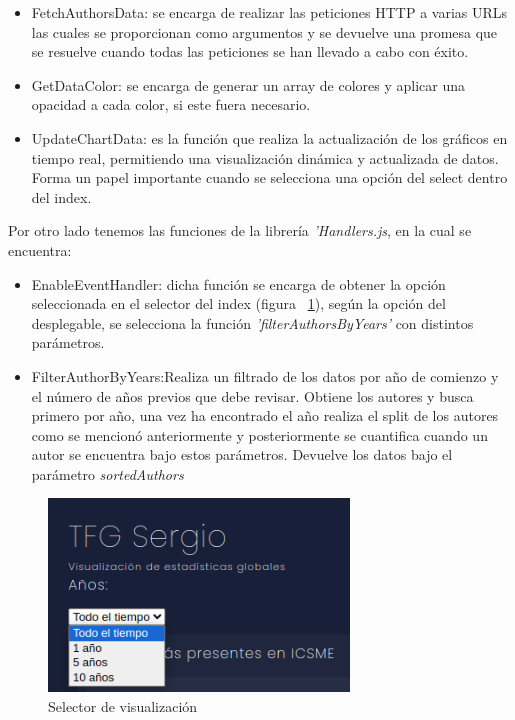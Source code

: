 \documentclass[a4paper, 12pt]{book}
\begin{document}
\begin{itemize}
    \item FetchAuthorsData: se encarga de realizar las peticiones HTTP a varias URLs las cuales se proporcionan como argumentos y se devuelve una promesa que se resuelve cuando todas las peticiones se han llevado a cabo con éxito.
    \item GetDataColor: se encarga de generar un array de colores y aplicar una opacidad a cada color, si este fuera necesario.
    \item UpdateChartData: es la función que realiza la actualización de los gráficos en tiempo real, permitiendo una visualización dinámica y actualizada de datos. Forma un papel importante cuando se selecciona una opción del select dentro del index.
\end{itemize}
Por otro lado tenemos las funciones de la librería \textit{'Handlers.js}, en la cual se encuentra:

\begin{itemize}
    \item EnableEventHandler: dicha función se encarga de obtener la opción seleccionada en el selector del index (figura ~\ref{fig:selector}), según la opción del desplegable, se selecciona la función \textit{'filterAuthorsByYears'} con distintos parámetros.

    \item FilterAuthorByYears:Realiza un filtrado de los datos por año de comienzo y el número de años previos que debe revisar. Obtiene los autores y busca primero por año, una vez ha encontrado el año realiza el split de los autores como se mencionó anteriormente y posteriormente se cuantifica cuando un autor se encuentra bajo estos parámetros. Devuelve los datos bajo el parámetro \textit{sortedAuthors}
\end{itemize}

\begin{figure}[h]
  \centering
  \includegraphics[width=8cm, keepaspectratio]{img/selector.png}
  \caption{Selector de visualización}
  \label{fig:selector}
\end{figure}
\end{document}

